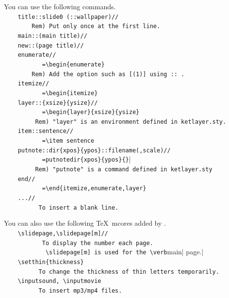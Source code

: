 \documentclass[papersize,a4paper,12pt]{article}
\begin{document}
You can use the following commands.\\
\verb|    title::slide0 (::wallpaper)//|\\
\verb|        Rem) Put only once at the first line.|\\
\verb|    main::(main title)//|\\
\verb|    new::(page title)//|\\
\verb|    enumerate//|\\
\verb|           =\begin{enumerate}|\\
\verb|        Rem) Add the option such as [(1)] using :: .|\\
\verb|    itemize//|\\
\verb|           =\begin{itemize}|\\
\verb|    layer::{xsize}{ysize}//|\\
\verb|           =\begin{layer}{xsize}{ysize}|\\
\verb|         Rem) "layer" is an environment defined in ketlayer.sty.|\\
\verb|    item::sentence//|\\
\verb|           =\item sentence|\\
\verb|    putnote::dir{xpos}{ypos}::filename(,scale)//|\\
\verb|           =putnotedir{xpos}{ypos}{}||\\
\verb|         Rem) "putnote" is a command defined in ketlayer.sty|\\
\verb|    end//|\\
\verb|           =\end{itemize,enumerate,layer}|\\
\verb|    ...//|\\
\verb|          To insert a blank line.|

\noindent
You can also use the following \TeX\ mcores added by \ketcindy.\\
\verb|    \slidepage,\slidepage[m]//|\\
\verb|           To display the number each page.|\\
\verb|            \slidepage[m] is used for the \verb|main| page.|\\
\verb|    \setthin{thickness}|\\
\verb|          To change the thickness of thin letters temporarily.|\\
\verb|    \inputsound, \inputmovie|\\
\verb|          To insert mp3/mp4 files.|
\end{document}
